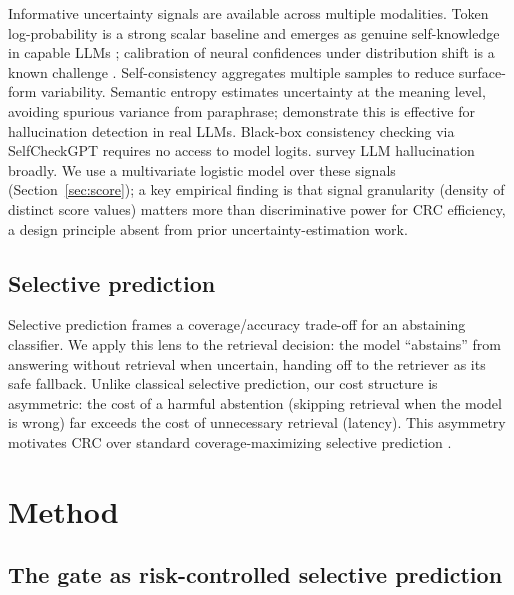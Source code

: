 \documentclass[a4paper,fleqn]{cas-dc}
\begin{document}
Informative uncertainty signals are available across multiple modalities.
Token log-probability is a strong scalar baseline and emerges as genuine
self-knowledge in capable LLMs \citep{kadavath2022know}; calibration of
neural confidences under distribution shift is a known challenge
\citep{guo2017calibration,xiong2024llmuncertainty}. Self-consistency
\citep{wang2023selfconsistency} aggregates multiple samples to reduce surface-form
variability. Semantic entropy \citep{kuhn2023semantic} estimates uncertainty at
the meaning level, avoiding spurious variance from paraphrase;
\citet{farquhar2024detecting} demonstrate this is effective for hallucination
detection in real LLMs. Black-box consistency checking via SelfCheckGPT
\citep{manakul2023selfcheckgpt} requires no access to model logits.
\citet{ji2023hallucination} survey LLM hallucination broadly. We use a
multivariate logistic model over these signals (Section~\ref{sec:score}); a key
empirical finding is that signal granularity (density of distinct score
values) matters more than discriminative power for CRC efficiency, a design
principle absent from prior uncertainty-estimation work.

\subsection{Selective prediction}

Selective prediction \citep{geifman2017selective} frames a coverage/accuracy
trade-off for an abstaining classifier. We apply this lens to the retrieval
decision: the model ``abstains'' from answering without retrieval when uncertain,
handing off to the retriever as its safe fallback. Unlike classical selective
prediction, our cost structure is asymmetric: the cost of a harmful abstention
(skipping retrieval when the model is wrong) far exceeds the cost of unnecessary
retrieval (latency). This asymmetry motivates CRC over standard
coverage-maximizing selective prediction \citep{geifman2017selective}.

\section{Method}\label{sec:method}

\subsection{The gate as risk-controlled selective prediction}\label{sec:formal}
\end{document}
